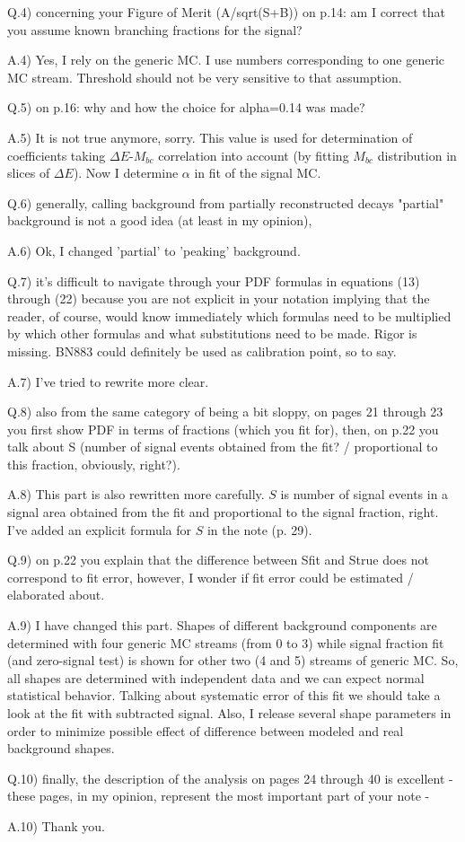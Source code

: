 \documentclass[a4paper,12pt]{article}
\begin{document}
Q.4) concerning your Figure of Merit (A/sqrt(S+B)) on p.14: am I correct that you assume known branching fractions for the signal?

A.4) Yes, I rely on the generic MC. I use numbers corresponding to one generic MC stream. Threshold should not be very sensitive to that assumption.

Q.5) on p.16:  why and how the choice for alpha=0.14 was made?

A.5) It is not true anymore, sorry. This value is used for determination of coefficients taking $\Delta E$-$M_{bc}$ correlation  into account (by fitting $M_{bc}$ distribution in slices of $\Delta E$). Now I determine $\alpha$ in fit of the signal MC.

Q.6) generally, calling background from partially reconstructed decays "partial" background is not a good idea (at least in my opinion),

A.6) Ok, I changed 'partial' to 'peaking' background.

Q.7) it's difficult to navigate through your PDF formulas in equations (13) through (22) because you are not explicit in your notation implying that the reader, of course, would know immediately which formulas need to be multiplied by which other formulas and what substitutions need to be made. Rigor is missing. BN883 could definitely be used as calibration point, so to say. 

A.7) I've tried to rewrite more clear.

Q.8) also from the same category of being a bit sloppy, on pages 21 through 23 you first show PDF in terms of fractions (which you fit for), then, on p.22 you talk about S (number of signal events obtained from the fit? / proportional to this fraction, obviously, right?). 

A.8) This part is also rewritten more carefully. $S$ is number of signal events in a signal area obtained from the fit and proportional to the signal fraction, right. I've added an explicit formula for $S$ in the note (p. 29).

Q.9) on p.22 you explain that the difference between Sfit and Strue does not correspond to fit error, however, I wonder if fit error could be estimated / elaborated about. 

A.9) I have changed this part. Shapes of different background components are determined with four generic MC streams (from 0 to 3) while signal fraction fit (and zero-signal test) is shown for other two (4 and 5) streams of generic MC. So, all shapes are determined with independent data and we can expect normal statistical behavior. Talking about systematic error of this fit we should take a look at the fit with subtracted signal. Also, I release several shape parameters in order to minimize possible effect of difference between modeled and real background shapes.

Q.10) finally, the description of the analysis on pages 24 through 40 is excellent - these pages, in my opinion, represent the most important part of your note -

A.10) Thank you.
\end{document}
